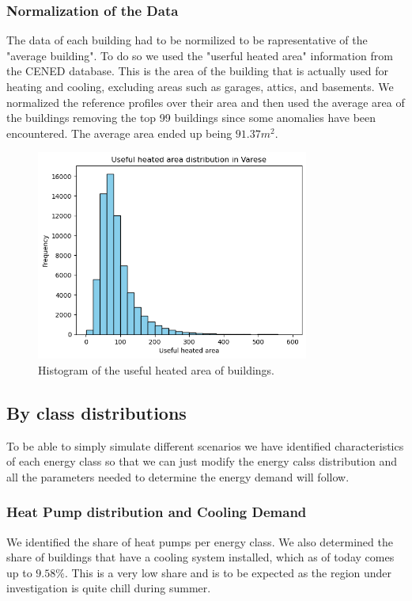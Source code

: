 
\subsubsection{Normalization of the Data}
The data of each building had to be normilized to be rapresentative of the "average building".
To do so we used the "userful heated area" information from the CENED database.
This is the area of the building that is actually used for heating and cooling, excluding areas such as garages, attics, and basements.
We normalized the reference profiles over their area and then used the average area 
of the buildings removing the top 99 buildings since some anomalies have been encountered.
The average area ended up being $91.37 m^2$.

\begin{figure}[H]
    \centering
    \includegraphics[width=0.8\textwidth]{figures/1_building_area_histogram.png}
    \caption{Histogram of the useful heated area of buildings.}
    \label{fig:building_area_histogram}
\end{figure}

\subsection{By class distributions}
To be able to simply simulate different scenarios we have identified characteristics of each energy class 
so that we can just modify the energy calss distribution and all the parameters needed to determine the energy demand will follow.

\subsubsection{Heat Pump distribution and Cooling Demand}
We identified the share of heat pumps per energy class.
We also determined the share of buildings that have a cooling system installed, which as of today comes up to $9.58\%$. 
This is a very low share and is to be expected as the region under investigation is quite chill during summer.

